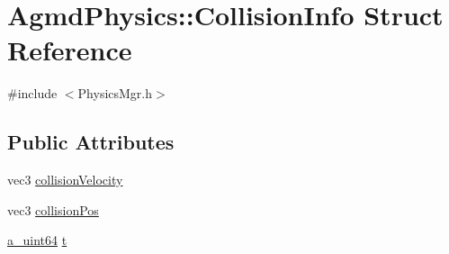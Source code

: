 \hypertarget{struct_agmd_physics_1_1_collision_info}{\section{Agmd\+Physics\+:\+:Collision\+Info Struct Reference}
\label{struct_agmd_physics_1_1_collision_info}
}


{\ttfamily \#include $<$Physics\+Mgr.\+h$>$}

\subsection*{Public Attributes}
\begin{DoxyCompactItemize}
\item 
vec3 \hyperlink{struct_agmd_physics_1_1_collision_info_a7be0279a10a58a8daff8a578afa309de}{collision\+Velocity}
\item 
vec3 \hyperlink{struct_agmd_physics_1_1_collision_info_ada9c764700fcc82da541de40e6373ab0}{collision\+Pos}
\item 
\hyperlink{_common_defines_8h_a6c5192ec3c55d6e5b13d2dbaa082bdea}{a\+\_\+uint64} \hyperlink{struct_agmd_physics_1_1_collision_info_afd1363c63af98df5a8ba01a09ff6392e}{t}
\end{DoxyCompactItemize}


